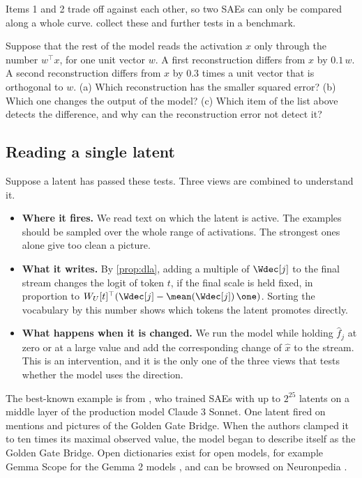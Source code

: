 Items 1 and 2 trade off against each other, so two SAEs can only be compared along a whole curve.
\citet{karvonen2025saebench} collect these and further tests in a benchmark.

\begin{exercise}\label{ex:wrongplace}
Suppose that the rest of the model reads the activation $x$ only through the number $w^\top x$, for one unit
vector $w$. A first reconstruction differs from $x$ by $0.1\,w$. A second reconstruction differs from $x$ by
$0.3$ times a unit vector that is orthogonal to $w$. (a) Which reconstruction has the smaller squared error? (b) Which one
changes the output of the model? (c) Which item of the list above detects the difference, and why can the
reconstruction error not detect it?
\end{exercise}

\subsection{Reading a single latent}
\label{sec:latent}

Suppose a latent has passed these tests. Three views are combined to understand it.

\begin{itemize}
\item \textbf{Where it fires.} We read text on which the latent is active. The examples should be sampled over
the whole range of activations. The strongest ones alone give too clean a picture.
\item \textbf{What it writes.} By \cref{prop:dla}, adding a multiple of $\Wdec[j]$ to the final stream changes
the logit of token $t$, if the final scale is held fixed, in proportion to $W_U[t]^\top(\Wdec[j]-\mean(\Wdec[j])\,\one)$. Sorting the vocabulary by
this number shows which tokens the latent promotes directly.
\item \textbf{What happens when it is changed.} We run the model while holding $\hat f_j$ at zero or at a large
value and add the corresponding change of $\hat x$ to the stream. This is an intervention, and it is the only
one of the three views that tests whether the model uses the direction.
\end{itemize}

The best-known example is from \citet{templeton2024scaling}, who trained SAEs with up to $2^{25}$ latents on a
middle layer of the production model Claude 3 Sonnet. One latent fired on mentions and pictures of the Golden
Gate Bridge. When the authors clamped it to ten times its maximal observed value, the model began to describe
itself as the Golden Gate Bridge. Open dictionaries exist for open models, for example Gemma Scope for the
Gemma 2 models \citep{lieberum2024gemma}, and can be browsed on Neuronpedia \citep{lin2023neuronpedia}.


